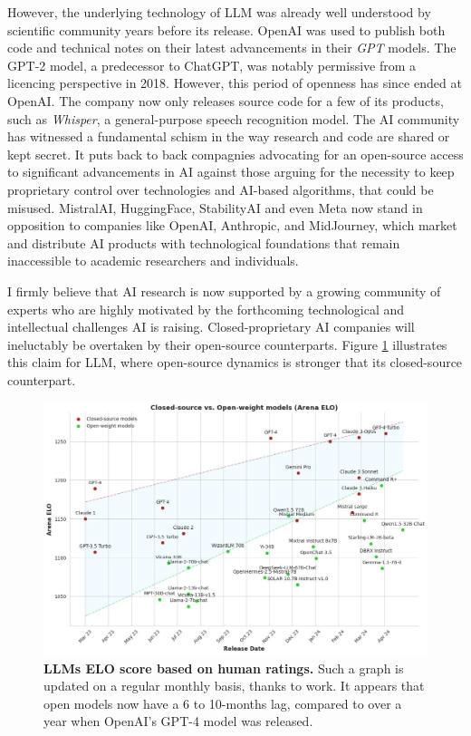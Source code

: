 However, the underlying technology of \ac{LLM} was already well understood by scientific community years before its release. OpenAI was used to publish both code and technical notes on their latest advancements in their \textit{GPT} models. The GPT-2 model, a predecessor to ChatGPT, was notably permissive from a licencing perspective in 2018. However, this period of openness has since ended at OpenAI. The company now only releases source code for a few of its products, such as \textit{Whisper}, a general-purpose speech recognition model. The \ac{AI} community has witnessed a fundamental schism in the way research and code are shared or kept secret. It puts back to back compagnies advocating for an open-source access to significant advancements in \ac{AI} against those arguing for the necessity to keep proprietary control over technologies and \ac{AI}-based algorithms, that could be misused. MistralAI, HuggingFace, StabilityAI and even Meta now stand in opposition to companies like OpenAI, Anthropic, and MidJourney, which market and distribute \ac{AI} products with technological foundations that remain inaccessible to academic researchers and individuals. 

I firmly believe that \ac{AI} research is now supported by a growing community of experts who are highly motivated by the forthcoming technological and intellectual challenges \ac{AI} is raising. Closed-proprietary \ac{AI} companies will ineluctably be overtaken by their open-source counterparts. Figure \ref{fig:conclusion-openclose} illustrates this claim for \ac{LLM}, where open-source dynamics is stronger that its closed-source counterpart. 

\begin{figure}[htb!]
    \center
  \includegraphics[width=\linewidth]{images/conclusion/open-close.jpeg}
  \caption{\textbf{LLMs ELO score based on human ratings.} Such a graph is updated on a regular monthly basis, thanks to \citep{chiang2024chatbot} work. It appears that open models now have a 6 to 10-months lag, compared to over a year when OpenAI's GPT-4 model was released.}
  \label{fig:conclusion-openclose}
\end{figure}

